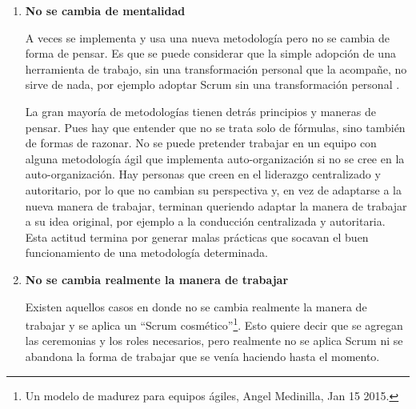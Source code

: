 \begin{enumerate}
Desde esta perspectiva, hay que tener en cuenta que el uso de post-its y gráficos bosquejos que parecen infantiles no debería reemplazar el uso de herramientas conceptuales de diagramación como son: Unified Modeling Language, Architecture Description Language, Business Process Modeling Notation, Conceptual Diagram or ConceptDraw, Causal Loop Diagram, Entity Relationship Diagram, Flow Charts (para control de flujo), Data Flow Diagram, Structure Chart, Stock and Flow Diagrams, Structured Systems Analysis and Design Method, Map Mind Diagram, etc. El uso de dinámicas y conversaciones tampoco debería sustituir el Análisis de Sistemas, Investigación Operativa y las prácticas profesionales\footnote{\cite{SWEBOKv3-2014}} de Ingeniería de software; y la simplicidad no debería desplazar el uso de herramientas de software ni la eliminación de métricas fundamentales. La Ingeniería del Software intenta dar un marco de trabajo en el que se aplican práctica del conocimiento científico en el diseño y construcción de software con mayor calidad. 


\item \textbf{No se cambia de mentalidad}

A veces se implementa y usa una nueva metodología pero no se cambia de forma de pensar. Es que se puede considerar que la simple adopción de una herramienta de trabajo, sin una transformación personal que la acompañe, no sirve de nada, por ejemplo adoptar Scrum sin una transformación personal \cite{Martin-Alaimo-Kleer-2014}. 

La gran mayoría de metodologías tienen detrás principios y maneras de pensar. Pues hay que entender que no se trata solo de fórmulas, sino también de formas de razonar. No se puede pretender trabajar en un equipo con alguna metodología ágil que implementa auto-organización si no se cree en la auto-organización. Hay personas que creen en el liderazgo centralizado y autoritario, por lo que no cambian su perspectiva y, en vez de adaptarse a la nueva manera de trabajar, terminan queriendo adaptar la manera de trabajar a su idea original, por ejemplo a la conducción centralizada y autoritaria. Esta actitud termina por generar malas prácticas que socavan el buen funcionamiento de una metodología determinada.

\item \textbf{No se cambia realmente la manera de trabajar}

Existen aquellos casos en donde no se cambia realmente la manera de trabajar y se aplica un “Scrum cosmético”\footnote{Un modelo de madurez para equipos ágiles, Angel Medinilla, Jan 15 2015.}. Esto quiere decir que se agregan las ceremonias y los roles necesarios, pero realmente no se aplica Scrum ni se abandona la forma de trabajar que se venía haciendo hasta el momento.


\end{enumerate}
